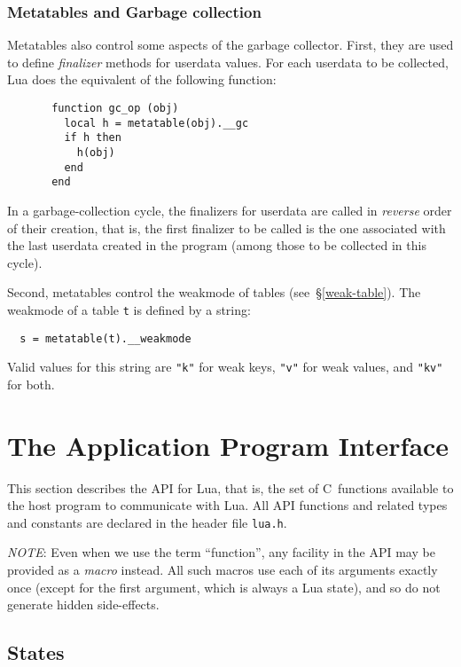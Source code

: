 \documentclass[11pt,twoside,draft]{article}
\makeatletter
\newcommand{\See}[1]{\S\ref{#1}}
\newcommand{\see}[1]{(see~\See{#1})}
\newcommand{\IndexEmph}[1]{\emph{#1}\index{#1@{\lowercase{#1}}}}
\newcommand{\NOTE}{\par\medskip\noindent\emph{NOTE}: }
\makeatother
\begin{document}
\subsubsection{Metatables and Garbage collection}

Metatables also control some aspects of the garbage collector.
First, they are used to define \IndexEmph{finalizer} methods
for userdata values.
For each userdata to be collected,
Lua does the equivalent of the following function:
\begin{verbatim}
       function gc_op (obj)
         local h = metatable(obj).__gc
         if h then
           h(obj)
         end
       end
\end{verbatim}
In a garbage-collection cycle,
the finalizers for userdata are called in \emph{reverse}
order of their creation,
that is, the first finalizer to be called is the one associated
with the last userdata created in the program
(among those to be collected in this cycle).

Second, metatables control the weakmode of tables \see{weak-table}.
The weakmode of a table \verb|t| is defined by a string:
\label{weakmode}
\begin{verbatim}
  s = metatable(t).__weakmode
\end{verbatim}
Valid values for this string are \verb|"k"| for weak keys,
\verb|"v"| for weak values,
and \verb|"kv"| for both.



\section{The Application Program Interface}\label{API}
This section describes the API for Lua, that is,
the set of C~functions available to the host program to communicate
with Lua.
All API functions and related types and constants
are declared in the header file \verb|lua.h|.

\NOTE
Even when we use the term ``function'',
any facility in the API may be provided as a \emph{macro} instead.
All such macros use each of its arguments exactly once
(except for the first argument, which is always a Lua state),
and so do not generate hidden side-effects.


\subsection{States} \label{mangstate}
\end{document}
